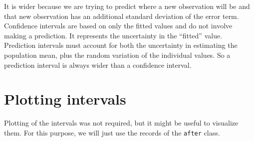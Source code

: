 \documentclass[
  oneside]{book}
\begin{document}
It is wider because we are trying to predict where a new observation will
be and that new observation has an additional standard deviation of the error
term. Confidence intervals are based on only the fitted values and do not
involve making a prediction. It represents the uncertainty in the ``fitted''
value. Prediction intervals must account for both the uncertainty in
estimating the population mean, plus the random variation of the individual
values. So a prediction interval is always wider than a confidence
interval.

\hypertarget{plotting-intervals}{%
\section{Plotting intervals}\label{plotting-intervals}}

Plotting of the intervals was not required, but it might be useful to visualize them.
For this purpose, we will just use the records of the \texttt{after} class.
\end{document}
